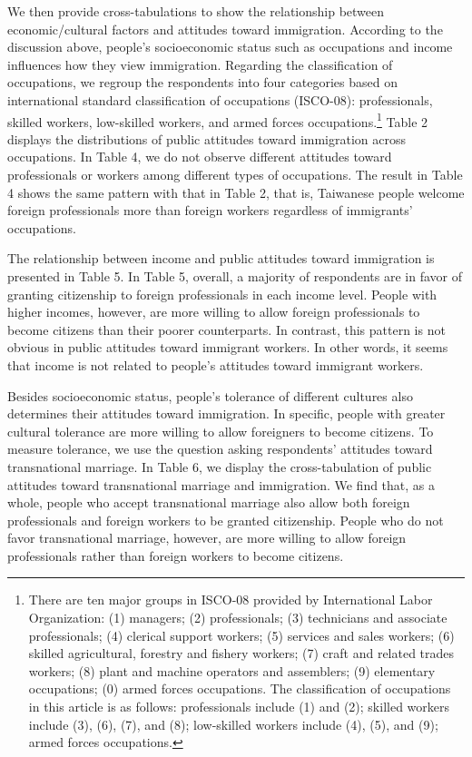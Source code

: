 \documentclass[12pt]{article}
\begin{document}
We then provide cross-tabulations to show the relationship between economic/cultural factors and attitudes toward immigration. According to the discussion above, people's socioeconomic status such as occupations and income influences how they view immigration. Regarding the classification of occupations, we regroup the respondents into four categories based on international standard classification of occupations (ISCO-08): professionals, skilled workers, low-skilled workers, and armed forces occupations.\footnote{There are ten major groups in ISCO-08 provided by International Labor Organization: (1) managers; (2) professionals; (3) technicians and associate professionals; (4) clerical support workers; (5) services and sales workers; (6) skilled agricultural, forestry and fishery workers; (7) craft and related trades workers; (8) plant and machine operators and assemblers; (9) elementary occupations; (0) armed forces occupations. The classification of occupations in this article is as follows: professionals include (1) and (2); skilled workers include (3), (6), (7), and (8); low-skilled workers include (4), (5), and (9); armed forces occupations.} Table 2 displays the distributions of public attitudes toward immigration across occupations. In Table 4, we do not observe different attitudes toward professionals or workers among different types of occupations. The result in Table 4 shows the same pattern with that in Table 2, that is, Taiwanese people welcome foreign professionals more than foreign workers regardless of immigrants' occupations.


The relationship between income and public attitudes toward immigration is presented in Table 5. In Table 5, overall, a majority of respondents are in favor of granting citizenship to foreign professionals in each income level. People with higher incomes, however, are more willing to allow foreign professionals to become citizens than their poorer counterparts. In contrast, this pattern is not obvious in public attitudes toward immigrant workers. In other words, it seems that income is not related to people's attitudes toward immigrant workers.


Besides socioeconomic status, people's tolerance of different cultures also determines their attitudes toward immigration. In specific, people with greater cultural tolerance are more willing to allow foreigners to become citizens. To measure tolerance, we use the question asking respondents' attitudes toward transnational marriage. In Table 6, we display the cross-tabulation of public attitudes toward transnational marriage and immigration. We find that, as a whole, people who accept transnational marriage also allow both foreign professionals and foreign workers to be granted citizenship. People who do not favor transnational marriage, however, are more willing to allow foreign professionals rather than foreign workers to become citizens.
\end{document}
